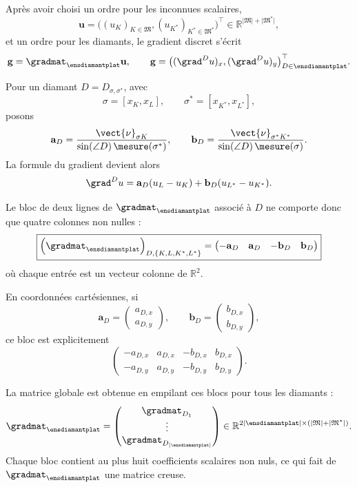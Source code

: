 Après avoir choisi un ordre pour les inconnues scalaires,
\[
\mathbf u=
\bigl((u_K)_{K\in\mathfrak M},
      (u_{K^\ast})_{K^\ast\in\mathfrak M^\ast}\bigr)^\top
\in\mathbb R^{\lvert\mathfrak M\rvert+\lvert\mathfrak M^\ast\rvert},
\]
et un ordre pour les diamants, le gradient discret s'écrit
\[
\mathbf g=\gradmat_{\ensdiamantplat}\mathbf u,
\qquad
\mathbf g=
\bigl((\grad^D u)_x,(\grad^D u)_y\bigr)_{D\in\ensdiamantplat}^{\top}.
\]

Pour un diamant \(D=D_{\sigma,\sigma^\ast}\), avec
\[
\sigma=[x_K,x_L],
\qquad
\sigma^\ast=[x_{K^\ast},x_{L^\ast}],
\]
posons
\[
\mathbf a_D
=
\frac{\vect{\nu}_{\sigma K}}
{\sin(\angle D)\,\mesure(\sigma^\ast)},
\qquad
\mathbf b_D
=
\frac{\vect{\nu}_{\sigma^\ast K^\ast}}
{\sin(\angle D)\,\mesure(\sigma)}.
\]
La formule du gradient devient alors
\[
\grad^D u
=
\mathbf a_D(u_L-u_K)
+
\mathbf b_D(u_{L^\ast}-u_{K^\ast}).
\]

Le bloc de deux lignes de \(\gradmat_{\ensdiamantplat}\) associé à \(D\) ne comporte donc que quatre colonnes non nulles :
\[
\boxed{
\left(\gradmat_{\ensdiamantplat}\right)_{D,\{K,L,K^\ast,L^\ast\}}
=
\begin{pmatrix}
-\mathbf a_D & \mathbf a_D & -\mathbf b_D & \mathbf b_D
\end{pmatrix}}
\]
où chaque entrée est un vecteur colonne de \(\mathbb R^2\).

En coordonnées cartésiennes, si
\[
\mathbf a_D=
\begin{pmatrix}a_{D,x}\\a_{D,y}\end{pmatrix},
\qquad
\mathbf b_D=
\begin{pmatrix}b_{D,x}\\b_{D,y}\end{pmatrix},
\]
ce bloc est explicitement
\[
\begin{pmatrix}
-a_{D,x} & a_{D,x} & -b_{D,x} & b_{D,x}\\
-a_{D,y} & a_{D,y} & -b_{D,y} & b_{D,y}
\end{pmatrix}.
\]

La matrice globale est obtenue en empilant ces blocs pour tous les diamants :
\[
\gradmat_{\ensdiamantplat}
=
\begin{pmatrix}
\gradmat_{D_1}\\
\vdots\\
\gradmat_{D_{\lvert\ensdiamantplat\rvert}}
\end{pmatrix}
\in
\mathbb R^{2\lvert\ensdiamantplat\rvert
\times
(\lvert\mathfrak M\rvert+\lvert\mathfrak M^\ast\rvert)}.
\]
Chaque bloc contient au plus huit coefficients scalaires non nuls, ce qui fait de \(\gradmat_{\ensdiamantplat}\) une matrice creuse.
